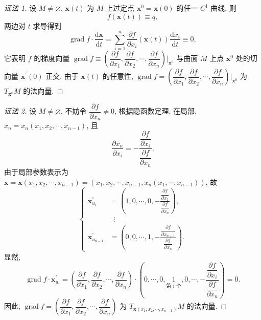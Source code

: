 \begin{proof}[证法 1]
设 $M \neq \varnothing$, $\boldsymbol{x}(t)$ 为 $M$ 上过定点 $\boldsymbol{x}^{0} = \boldsymbol{x}(0)$ 的任一 $C^{1}$ 曲线, 则
\[
  f(\boldsymbol{x}(t)) \equiv q,
\]
两边对 $t$ 求导得到
\[
  \operatorname{grad}f \cdot \frac{\mathrm{d}\boldsymbol{x}}{\mathrm{d}t} = \sum_{i=1}^{n}\frac{\partial f}{\partial x_{i}}(\boldsymbol{x}(t))\frac{\mathrm{d}x_{i}}{\mathrm{d}t} \equiv 0,
\]
它表明 $f$ 的梯度向量 $\operatorname{grad}f \equiv \left(\dfrac{\partial f}{\partial x_{1}}, \dfrac{\partial f}{\partial x_{2}}, \cdots, \dfrac{\partial f}{\partial x_{n}}\right)\bigg|_{\boldsymbol{x}^{0}}$ 与曲面 $M$ 上点 $\boldsymbol{x}^{0}$ 处的切向量 $\boldsymbol{x}^{\prime}(0)$ 正交. 由于 $\boldsymbol{x}(t)$ 的任意性, $\operatorname{grad}f = \left(\dfrac{\partial f}{\partial x_{1}}, \dfrac{\partial f}{\partial x_{2}}, \cdots, \dfrac{\partial f}{\partial x_{n}}\right)\bigg|_{\boldsymbol{x}^{0}}$ 为 $T_{\boldsymbol{x}^{0}}M$ 的法向量.
\end{proof}

\begin{proof}[证法 2]
设 $M \neq \varnothing$, 不妨令 $\dfrac{\partial f}{\partial x_{n}} \neq 0$, 根据隐函数定理, 在局部, $x_{n} = x_{n}(x_{1}, x_{2}, \cdots, x_{n-1})$, 且
\[
  \frac{\partial x_{n}}{\partial x_{i}} = -\frac{\dfrac{\partial f}{\partial x_{i}}}{\dfrac{\partial f}{\partial x_{n}}}.
\]
由于局部参数表示为 $\boldsymbol{x} = \boldsymbol{x}(x_{1}, x_{2}, \cdots, x_{n-1}) = (x_{1}, x_{2}, \cdots, x_{n-1}, x_{n}(x_{1}, \cdots, x_{n-1}))$, 故
\[
  \left\{\begin{aligned}
    \boldsymbol{x}_{u_{1}}^{\prime} &= \left(1, 0, \cdots, 0, -\frac{\dfrac{\partial f}{\partial x_{1}}}{\dfrac{\partial f}{\partial x_{n}}}\right), \\
    &\;\;\vdots \\
    \boldsymbol{x}_{u_{n-1}}^{\prime} &= \left(0, 0, \cdots, 1, -\frac{\dfrac{\partial f}{\partial x_{n-1}}}{\dfrac{\partial f}{\partial x_{n}}}\right).
  \end{aligned}\right.
\]
显然,
\[
  \operatorname{grad}f \cdot \boldsymbol{x}_{u_{i}}^{\prime} = \left(\frac{\partial f}{\partial x_{1}}, \frac{\partial f}{\partial x_{2}}, \cdots, \frac{\partial f}{\partial x_{n}}\right) \cdot \left(0, \cdots, 0, \underset{\text{第 } i \text{ 个}}{1}, 0, \cdots, -\frac{\dfrac{\partial f}{\partial x_{i}}}{\dfrac{\partial f}{\partial x_{n}}}\right) = 0.
\]
因此, $\operatorname{grad}f = \left(\dfrac{\partial f}{\partial x_{1}}, \dfrac{\partial f}{\partial x_{2}}, \cdots, \dfrac{\partial f}{\partial x_{n}}\right)$ 为 $T_{\boldsymbol{x}(x_{1}, x_{2}, \cdots, x_{n-1})}M$ 的法向量. \qedhere
\end{proof}

